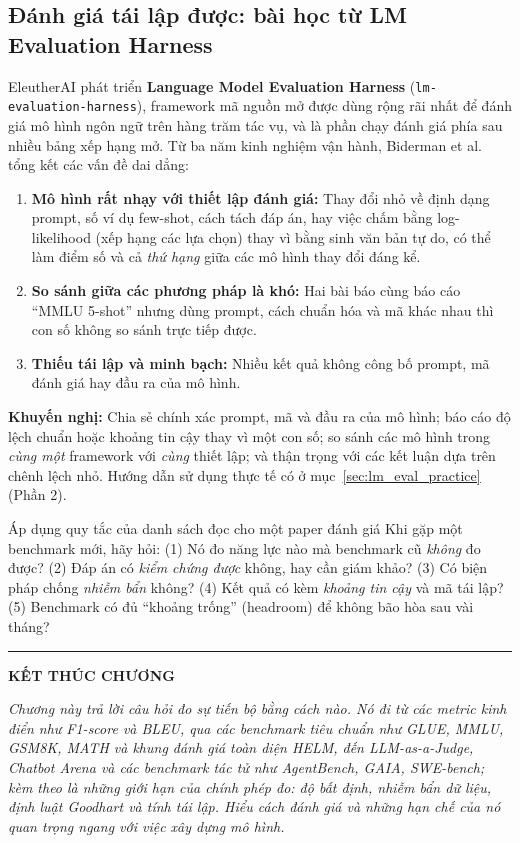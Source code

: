 \subsection{Đánh giá tái lập được: bài học từ LM Evaluation Harness}
\label{ssec:lm_eval_harness}
EleutherAI phát triển \textbf{Language Model Evaluation Harness} (\texttt{lm-\allowbreak evaluation-\allowbreak harness}), framework mã nguồn mở được dùng rộng rãi nhất để đánh giá mô hình ngôn ngữ trên hàng trăm tác vụ, và là phần chạy đánh giá phía sau nhiều bảng xếp hạng mở. Từ ba năm kinh nghiệm vận hành, Biderman et al. \cite{biderman2024lessons} tổng kết các vấn đề dai dẳng:
\begin{enumerate}
	\item \textbf{Mô hình rất nhạy với thiết lập đánh giá:} Thay đổi nhỏ về định dạng prompt, số ví dụ few-shot, cách tách đáp án, hay việc chấm bằng log-likelihood (xếp hạng các lựa chọn) thay vì bằng sinh văn bản tự do, có thể làm điểm số và cả \emph{thứ hạng} giữa các mô hình thay đổi đáng kể.
	\item \textbf{So sánh giữa các phương pháp là khó:} Hai bài báo cùng báo cáo “MMLU 5-shot” nhưng dùng prompt, cách chuẩn hóa và mã khác nhau thì con số không so sánh trực tiếp được.
	\item \textbf{Thiếu tái lập và minh bạch:} Nhiều kết quả không công bố prompt, mã đánh giá hay đầu ra của mô hình.
\end{enumerate}
\textbf{Khuyến nghị:} Chia sẻ chính xác prompt, mã và đầu ra của mô hình; báo cáo độ lệch chuẩn hoặc khoảng tin cậy thay vì một con số; so sánh các mô hình trong \emph{cùng một} framework với \emph{cùng} thiết lập; và thận trọng với các kết luận dựa trên chênh lệch nhỏ. Hướng dẫn sử dụng thực tế có ở mục~\ref{sec:lm_eval_practice} (Phần 2).

\begin{pitfall}{Áp dụng quy tắc của danh sách đọc cho một paper đánh giá}
Khi gặp một benchmark mới, hãy hỏi: (1) Nó đo năng lực nào mà benchmark cũ \emph{không} đo được? (2) Đáp án có \emph{kiểm chứng được} không, hay cần giám khảo? (3) Có biện pháp chống \emph{nhiễm bẩn} không? (4) Kết quả có kèm \emph{khoảng tin cậy} và mã tái lập? (5) Benchmark có đủ “khoảng trống” (headroom) để không bão hòa sau vài tháng?
\end{pitfall}

\bigskip
\hrule
\bigskip

\begin{center}
    \textbf{\Large KẾT THÚC CHƯƠNG \thechapter}
\end{center}

\textit{Chương này trả lời câu hỏi đo sự tiến bộ bằng cách nào. Nó đi từ các metric kinh điển như F1-score và BLEU, qua các benchmark tiêu chuẩn như GLUE, MMLU, GSM8K, MATH và khung đánh giá toàn diện HELM, đến LLM-as-a-Judge, Chatbot Arena và các benchmark tác tử như AgentBench, GAIA, SWE-bench; kèm theo là những giới hạn của chính phép đo: độ bất định, nhiễm bẩn dữ liệu, định luật Goodhart và tính tái lập. Hiểu cách đánh giá và những hạn chế của nó quan trọng ngang với việc xây dựng mô hình.}
